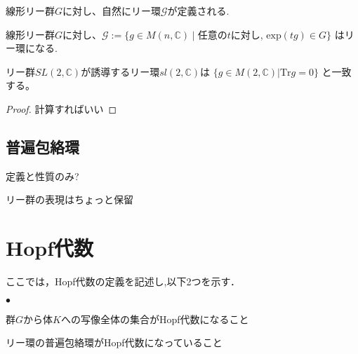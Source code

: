\documentclass{ujarticle}
\renewenvironment{itemize}%
{%
   \begin{list}{\parbox{1zw}{$\bullet$}}%
   {%
      \setlength{\topsep}{0zh}
      \setlength{\itemindent}{0zw}
      \setlength{\leftmargin}{2zw}%
      \setlength{\rightmargin}{0zw}%
      \setlength{\labelsep}{1zw}%
      \setlength{\labelwidth}{3zw}%
      \setlength{\itemsep}{0em}%
      \setlength{\parsep}{0em}%
      \setlength{\listparindent}{0zw}%
   }
}{%
   \end{list}%
}
\begin{document}
線形リー群$G$に対し、自然にリー環$\mathcal{G}$が定義される.
\begin{prop}
 線形リー群$G$に対し、$\mathcal{G}:=\{g \in M(n,\mathbb{C})\mid $任意の$t$に対し,
 $\mathrm{exp}(tg) \in G\}$ はリー環になる.
\end{prop}

\begin{epl}
リー群$SL(2,\mathbb{C})$が誘導するリー環$sl(2,\mathbb{C})$は
$\{ g \in M(2,\mathbb{C}) | \mathrm{Tr}g = 0 \}$
と一致する。
\end{epl}
\begin{proof}
 計算すればいい
\end{proof}

\subsection{普遍包絡環}
\label{sub:普遍包絡環}

定義と性質のみ?


リー群の表現はちょっと保留


\section{Hopf代数}
\label{sub:Hopf代数}
ここでは，Hopf代数の定義を記述し,以下2つを示す．
\begin{itemize}
  \item 群$G$から体$K$への写像全体の集合がHopf代数になること
  \item リー環の普遍包絡環がHopf代数になっていること
\end{itemize}
\end{document}
